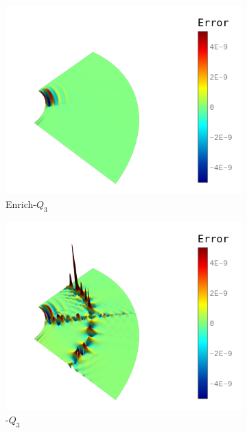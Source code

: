 \begin{figure}
	\center
	\captionsetup[subfigure]{labelformat=empty}
	\begin{subfigure}[t]{.45\linewidth}
		\center
		\includegraphics[scale=.4]{op_annular}
		\caption{Enrich-$Q_3$}
	\end{subfigure}
	\begin{subfigure}[t]{.45\linewidth}
		\center
		\includegraphics[scale=.4]{bezier_annular}
		\caption{\Bezier-$Q_3$}
	\end{subfigure}\\
	\center
	\begin{subfigure}[t]{.45\linewidth}

\end{subfigure}
\end{figure}
